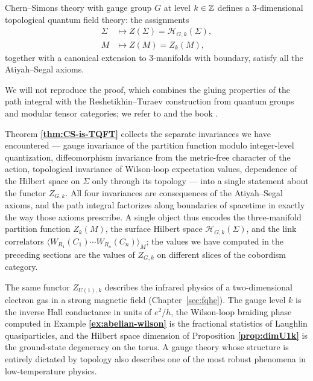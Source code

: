 \begin{theorem}\label{thm:CS-is-TQFT}
Chern--Simons theory with gauge group $G$ at level $k\in \mathbb{Z}$ defines a 3-dimensional topological quantum field theory: the assignments
\begin{align*}
\Sigma &\longmapsto Z(\Sigma) = \mathcal{H}_{G,k}(\Sigma), \\
M &\longmapsto Z(M) = Z_k(M),
\end{align*}
together with a canonical extension to 3-manifolds with boundary, satisfy all the Atiyah--Segal axioms.
\end{theorem}

\noindent We will not reproduce the proof, which combines the gluing properties of the path integral with the Reshetikhin--Turaev construction from quantum groups and modular tensor categories; we refer to \cite{ReshetikhinTuraev1991} and the book \cite{Turaev2016QuantumInvariants}.

\medskip

\noindent Theorem \textbf{\ref{thm:CS-is-TQFT}} collects the separate invariances we have encountered --- gauge invariance of the partition function modulo integer-level quantization, diffeomorphism invariance from the metric-free character of the action, topological invariance of Wilson-loop expectation values, dependence of the Hilbert space on $\Sigma$ only through its topology --- into a single statement about the functor $Z_{G,k}$. All four invariances are consequences of the Atiyah--Segal axioms, and the path integral factorizes along boundaries of spacetime in exactly the way those axioms prescribe. A single object thus encodes the three-manifold partition function $Z_k(M)$, the surface Hilbert space $\mathcal{H}_{G,k}(\Sigma)$, and the link correlators $\langle W_{R_1}(C_1)\cdots W_{R_n}(C_n)\rangle_M$; the values we have computed in the preceding sections are the values of $Z_{G,k}$ on different slices of the cobordism category.

\medskip

\noindent The same functor $Z_{U(1),k}$ describes the infrared physics of a two-dimensional electron gas in a strong magnetic field (Chapter~\ref{sec:fqhe}).  The gauge level $k$ is the inverse Hall conductance in units of $e^2/h$, the Wilson-loop braiding phase computed in Example \textbf{\ref{ex:abelian-wilson}} is the fractional statistics of Laughlin quasiparticles, and the Hilbert space dimension of Proposition \textbf{\ref{prop:dimU1k}} is the ground-state degeneracy on the torus.  A gauge theory whose structure is entirely dictated by topology also describes one of the most robust phenomena in low-temperature physics.

